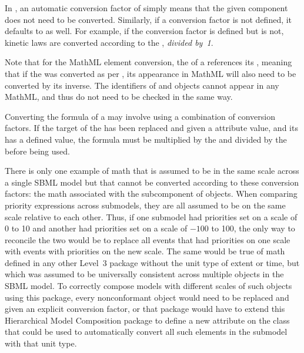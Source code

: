 In , an automatic conversion factor of  simply means that the given component does not need to be converted. Similarly, if a conversion factor is not defined, it defaults to  as well.  For example, if the conversion factor  is defined but  is not, kinetic laws are converted according to the , \emph{divided by~1}.

Note that for the MathML  element conversion, the  of a \Reaction references its \KineticLaw, meaning that if the \KineticLaw was converted as per , its appearance in MathML will also need to be converted by its inverse.  The identifiers of \AssignmentRule and \RateRule objects cannot appear in any MathML, and thus do not need to be checked in the same way.

Converting the formula of a \RateRule may involve using a combination of conversion factors.  If the target of the \RateRule has been replaced and given a  attribute value, and its \Submodel has a defined  value, the formula must be multiplied by the  and divided by the  before being used.

There is only one example of math that is assumed to be in the same scale across a single SBML model but that cannot be converted according to these conversion factors: the math associated with the \Priority subcomponent of \Event objects.  When comparing priority expressions across submodels, they are all assumed to be on the same scale relative to each other.  Thus, if one submodel had priorities set on a scale of 0 to 10 and another had priorities set on a scale of $-100$ to 100, the only way to reconcile the two would be to replace all events that had priorities on one scale with events with priorities on the new scale. The same would be true of math defined in any other Level~3 package without the unit type of extent or time, but which was assumed to be universally consistent across multiple objects in the SBML model.  To correctly compose models with different scales of such objects using this package, every nonconformant object would need to be replaced and given an explicit conversion factor, or that package would have to extend this Hierarchical Model Composition package to define a new attribute on the \Submodel class that could be used to automatically convert all such elements in the submodel with that unit type.


